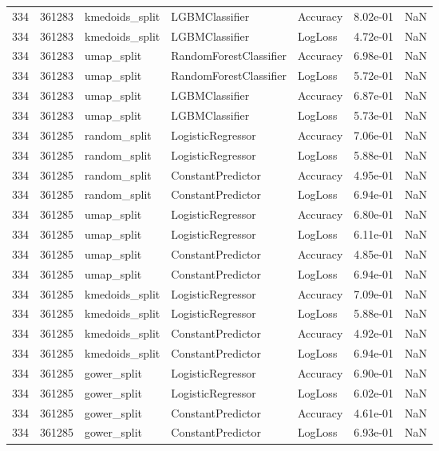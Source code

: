 \begin{tabular}{rrlllrr}
334 & 361283 & kmedoids\_split & LGBMClassifier & Accuracy & 8.02e-01 & NaN \\
334 & 361283 & kmedoids\_split & LGBMClassifier & LogLoss & 4.72e-01 & NaN \\
334 & 361283 & umap\_split & RandomForestClassifier & Accuracy & 6.98e-01 & NaN \\
334 & 361283 & umap\_split & RandomForestClassifier & LogLoss & 5.72e-01 & NaN \\
334 & 361283 & umap\_split & LGBMClassifier & Accuracy & 6.87e-01 & NaN \\
334 & 361283 & umap\_split & LGBMClassifier & LogLoss & 5.73e-01 & NaN \\
334 & 361285 & random\_split & LogisticRegressor & Accuracy & 7.06e-01 & NaN \\
334 & 361285 & random\_split & LogisticRegressor & LogLoss & 5.88e-01 & NaN \\
334 & 361285 & random\_split & ConstantPredictor & Accuracy & 4.95e-01 & NaN \\
334 & 361285 & random\_split & ConstantPredictor & LogLoss & 6.94e-01 & NaN \\
334 & 361285 & umap\_split & LogisticRegressor & Accuracy & 6.80e-01 & NaN \\
334 & 361285 & umap\_split & LogisticRegressor & LogLoss & 6.11e-01 & NaN \\
334 & 361285 & umap\_split & ConstantPredictor & Accuracy & 4.85e-01 & NaN \\
334 & 361285 & umap\_split & ConstantPredictor & LogLoss & 6.94e-01 & NaN \\
334 & 361285 & kmedoids\_split & LogisticRegressor & Accuracy & 7.09e-01 & NaN \\
334 & 361285 & kmedoids\_split & LogisticRegressor & LogLoss & 5.88e-01 & NaN \\
334 & 361285 & kmedoids\_split & ConstantPredictor & Accuracy & 4.92e-01 & NaN \\
334 & 361285 & kmedoids\_split & ConstantPredictor & LogLoss & 6.94e-01 & NaN \\
334 & 361285 & gower\_split & LogisticRegressor & Accuracy & 6.90e-01 & NaN \\
334 & 361285 & gower\_split & LogisticRegressor & LogLoss & 6.02e-01 & NaN \\
334 & 361285 & gower\_split & ConstantPredictor & Accuracy & 4.61e-01 & NaN \\
334 & 361285 & gower\_split & ConstantPredictor & LogLoss & 6.93e-01 & NaN \\

\end{tabular}
